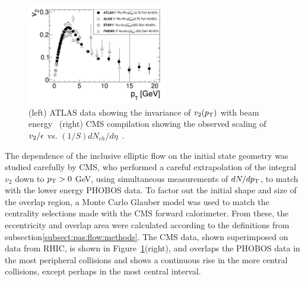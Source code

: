 \begin{figure}[!tb]
\begin{center}
\includegraphics[width=0.55\textwidth]{flowcorrelations_figs/atlas_v2_fig_06.pdf}
\caption[]{(left) ATLAS data showing the invariance of $\mbox{$v_2$}( \mbox{$p_{\mathrm{T}}$} )$
  with beam energy~\cite{ATLAS:2011ah} (right) CMS compilation showing
  the observed scaling of $\mbox{$v_2$} /\epsilon$ vs. $(1/S)
  dN_{ch}/d\eta$~\cite{Chatrchyan:2012ta}.}
\label{fig:pas:fc:scaling}
\end{center}
\end{figure}
The dependence of the inclusive elliptic flow on the initial state geometry was studied carefully by CMS, who
performed a careful extrapolation of the integral $v_2$ down to $\mbox{$p_{\mathrm{T}}$}>0$ GeV, using simultaneous measurements of
$dN/d\mbox{$p_{\mathrm{T}}$}$, to match with the lower energy PHOBOS data.
To factor out the initial shape and size of the overlap region, a Monte Carlo Glauber model was used to match
the centrality selections made with the CMS forward calorimeter.
From these, the eccentricity and overlap area were calculated according to the definitions from
subsection\ref{subsect:pas:flow:methods}.  The CMS data, shown superimposed on data from RHIC, is shown in
Figure~\ref{fig:pas:fc:scaling}(right), and overlaps the PHOBOS data in the most peripheral collisions and
shows a continuous rise in the more central collisions, except perhaps in the most central interval.

